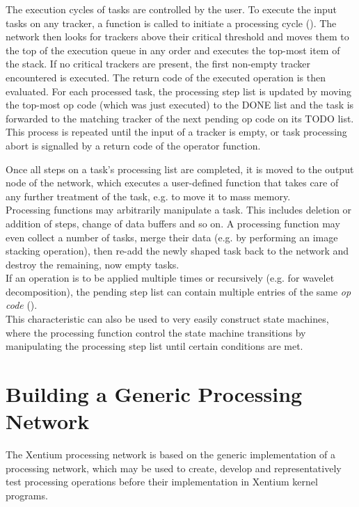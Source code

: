 The execution cycles of tasks are controlled by the user. To execute the input
tasks on any tracker, a function is called to initiate a processing cycle
(). The network then looks for trackers above their
critical threshold and moves them to the top of the execution queue in any
order and executes the top-most item of the stack. If no critical trackers are
present, the first non-empty tracker encountered is executed. The return code
of the executed operation is then evaluated.  For each processed task, the
processing step list is updated by moving the top-most op code (which was just
executed) to the DONE list and the task is forwarded to the matching
tracker of the next pending op code on its TODO list. This process is
repeated until the input of a tracker is empty, or task processing abort is
signalled by a return code of the operator function.

Once all steps on a task's processing list are completed, it is moved to the
output node of the network, which executes a user-defined function that takes
care of any further treatment of the task, e.g. to move it to mass memory.
\\

Processing functions may arbitrarily manipulate a task. This includes deletion
or addition of steps, change of data buffers and so on. A processing function
may even collect a number of tasks, merge their data (e.g. by performing an
image stacking operation), then re-add the newly shaped task back to the
network and destroy the remaining, now empty tasks.
\\

If an operation is to be applied multiple times or recursively (e.g. for
wavelet decomposition), the pending step list can contain multiple entries of
the same \emph{op code} ().
\\

This characteristic can also be used to very easily construct state machines,
where the processing function control the state machine transitions by
manipulating the processing step list until certain conditions are met.



\section{Building a Generic Processing Network}

The Xentium processing network is based on the generic implementation of a
processing network, which may be used to create, develop and representatively
test processing operations before their implementation in Xentium kernel
programs.
\\

